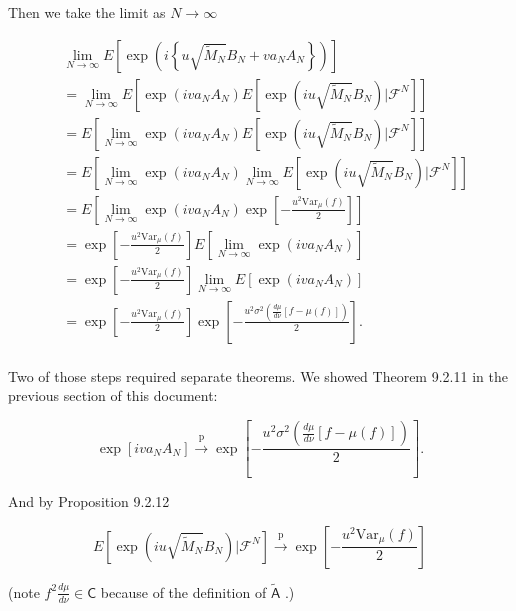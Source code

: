 \documentclass{article}
\begin{document}
Then we take the limit as $N \to \infty$

\begin{align*}
&\lim_{N \to \infty} E\left[\exp\left(i \left\{ u \sqrt{\tilde{M}_N} B_N + v a_N A_N \right\} \right) \right] \\
&= \lim_{N \to \infty} E\left[ \exp\left(i v a_N A_N  \right) E\left[ \exp\left(i u \sqrt{\tilde{M}_N} B_N \right)  \bigg\rvert \mathcal{F}^N\right] \right] \tag{previous} \\
&=  E\left[ \lim_{N \to \infty} \exp\left(i v a_N A_N  \right) E\left[ \exp\left(i u \sqrt{\tilde{M}_N} B_N \right)  \bigg\rvert \mathcal{F}^N\right] \right] \tag{DCT} \\
&=  E\left[ \lim_{N \to \infty} \exp\left(i v a_N A_N  \right) \lim_{N \to \infty}E\left[ \exp\left(i u \sqrt{\tilde{M}_N} B_N \right)  \bigg\rvert \mathcal{F}^N\right] \right]  \tag{limit properties} \\
&= E\left[ \lim_{N \to \infty} \exp\left(i v a_N A_N  \right) \exp\left[-\frac{u^2 \text{Var}_{\mu}(f) }{2} \right] \right] \tag{9.2.12} \\
&= \exp\left[-\frac{u^2 \text{Var}_{\mu}(f) }{2} \right]  E\left[ \lim_{N \to \infty} \exp\left(i v a_N A_N  \right) \right] \tag{linearity of $E$} \\
&= \exp\left[-\frac{u^2 \text{Var}_{\mu}(f) }{2} \right] \lim_{N \to \infty}   E\left[ \exp\left(i v a_N A_N  \right) \right] \tag{DCT} \\
&= \exp\left[-\frac{u^2 \text{Var}_{\mu}(f) }{2} \right] \exp\left[ - \frac{u^2 \sigma^2\left( \frac{d\mu}{d\nu}\left[f - \mu(f) \right] \right)}{2} \right] \tag{Theorem 9.2.11}. \\
\end{align*}

Two of those steps required separate theorems. We showed Theorem 9.2.11 in the previous section of this document:

$$
\exp\left[i v a_NA_N \right]  \overset{\text{p}}{\to} \exp\left[ - \frac{u^2 \sigma^2\left( \frac{d\mu}{d\nu}\left[f - \mu(f) \right] \right)}{2} \right].
$$

And by Proposition 9.2.12

$$
E\left[ \exp\left(i u \sqrt{\tilde{M}_N} B_N \right)  \bigg\rvert \mathcal{F}^N\right] \overset{\text{p}}{\to} \exp\left[-\frac{u^2 \text{Var}_{\mu}(f) }{2} \right]
$$

(note $f^2\frac{d\mu}{d\nu} \in \mathsf{C}$ because of the definition of $\tilde{\mathsf{A}}$ .)
\end{document}

